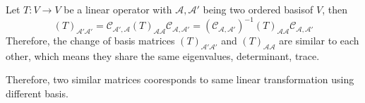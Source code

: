 \begin{remark}
Let $T:V\to V$ be a linear operator with $\mathcal{A},\mathcal{A}'$ being two ordered basisof $V$, then
\[
(T)_{\mathcal{A}'\mathcal{A}'}
=
\mathcal{C}_{\mathcal{A}',\mathcal{A}}
(T)_{\mathcal{A}\mathcal{A}}\mathcal{C}_{\mathcal{A},\mathcal{A}'}
=
(\mathcal{C}_{\mathcal{A},\mathcal{A}'})^{-1}
(T)_{\mathcal{A}\mathcal{A}}\mathcal{C}_{\mathcal{A},\mathcal{A}'}
\]
Therefore, the change of basis matrices $(T)_{\mathcal{A}'\mathcal{A}'}$ and $(T)_{\mathcal{A}\mathcal{A}}$ are similar to each other, which means they share the same eigenvalues, determinant, trace.

Therefore, two similar matrices cooresponds to same linear transformation using different basis.
\end{remark}















